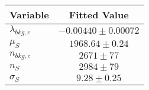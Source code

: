 \begin{tabular}[t]{lc}
\hline
Variable &Fitted Value\\
\hline\hline
$\lambda_{bkg,c}$&$-0.00440\pm0.00072$\\
\hline
$\mu_{S}$&$1968.64\pm0.24$\\
\hline
$n_{bkg,c}$&$2671\pm77$\\
\hline
$n_{S}$&$2984\pm79$\\
\hline
$\sigma_{S}$&$9.28\pm0.25$\\
\hline
\end{tabular}